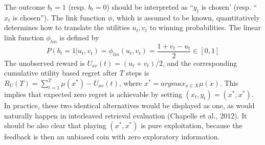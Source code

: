 \documentclass{llncs}
\begin{document}
	The outcome $b_t = 1$ (resp. $b_t = 0$) should be interpreted as “$y_t$ is chosen’ (resp. “$x_t$ is chosen”).
	The link function $\phi$, which is assumed to be known, quantitatively determines how to translate the utilities $u_t, v_t$ to winning probabilities. 
	The linear link function $\phi_{lin}$ is defined by
	$$P(b_t = 1|u_t, v_t) = \phi_{lin}(u_t, v_t) = \frac{1+v_t-u_t}{2}\in [0,1]$$
The unobserved reward is $U_{av}(t) = (u_t + v_t)/2$, and the corresponding cumulative utility based regret after $T$ steps is $R_U(T) = \sum_{t=1}^T \mu(x^*)-U_{av}(t)$, where $x^* = argmax_{x \in X} \mu(x)$. 
This implies that expected zero regret is achievable by setting $(x_t, y_t) = (x^*,x^*)$.
In practice, these two identical alternatives would be displayed as one, as would naturally happen in interleaved retrieval evaluation (Chapelle et al., 2012). 
It should be also clear that playing $(x^*,x^*)$ is pure exploitation, because the feedback is then an unbiased coin with zero exploratory information.
	
\end{document}
